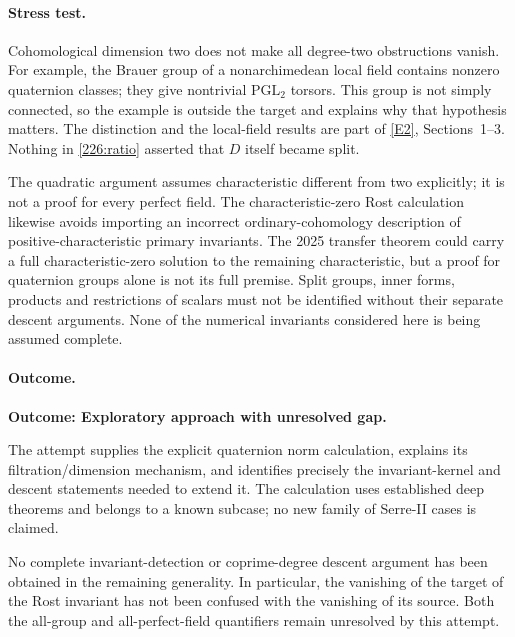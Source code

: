 \documentclass[11pt,a4paper]{article}
\newcommand{\eref}[2]{\hyperlink{extra:#1:#2}{[E#2]}}
\numberwithin{equation}{section}
\begin{document}
\paragraph{Stress test.}
Cohomological dimension two does not make all degree-two obstructions
vanish. For example, the Brauer group of a nonarchimedean local field
contains nonzero quaternion classes; they give nontrivial
$\mathrm{PGL}_2$ torsors. This group is not simply connected, so the
example is outside the target and explains why that hypothesis matters.
The distinction and the local-field results are part of
\eref{226}{2}, Sections~1--3. Nothing in \eqref{226:ratio} asserted that
$D$ itself became split.

The quadratic argument assumes characteristic different from two
explicitly; it is not a proof for every perfect field. The
characteristic-zero Rost calculation likewise avoids importing an
incorrect ordinary-cohomology description of positive-characteristic
primary invariants. The 2025 transfer theorem could carry a full
characteristic-zero solution to the remaining characteristic, but a
proof for quaternion groups alone is not its full premise. Split groups,
inner forms, products and restrictions of scalars must not be identified
without their separate descent arguments. None of the numerical
invariants considered here is being assumed complete.

\paragraph{Outcome.}
\textbf{Outcome: Exploratory approach with unresolved gap.}

The attempt supplies the explicit quaternion norm calculation, explains
its filtration/dimension mechanism, and identifies precisely the
invariant-kernel and descent statements needed to extend it. The
calculation uses established deep theorems and belongs to a known
subcase; no new family of Serre-II cases is claimed.

No complete invariant-detection or coprime-degree descent argument has
been obtained in the remaining generality. In particular, the vanishing
of the target of the Rost invariant has not been confused with the
vanishing of its source. Both the all-group and all-perfect-field
quantifiers remain unresolved by this attempt.
\end{document}
